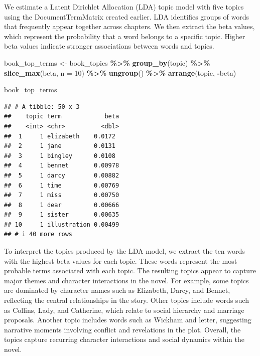 \documentclass[
]{article}
\newenvironment{Shaded}{\begin{snugshade}}{\end{snugshade}}
\newcommand{\AttributeTok}[1]{\textcolor[rgb]{0.13,0.29,0.53}{#1}}
\newcommand{\DecValTok}[1]{\textcolor[rgb]{0.00,0.00,0.81}{#1}}
\newcommand{\FunctionTok}[1]{\textcolor[rgb]{0.13,0.29,0.53}{\textbf{#1}}}
\newcommand{\NormalTok}[1]{#1}
\newcommand{\OtherTok}[1]{\textcolor[rgb]{0.56,0.35,0.01}{#1}}
\newcommand{\SpecialCharTok}[1]{\textcolor[rgb]{0.81,0.36,0.00}{\textbf{#1}}}
\begin{document}
We estimate a Latent Dirichlet Allocation (LDA) topic model with five
topics using the DocumentTermMatrix created earlier. LDA identifies
groups of words that frequently appear together across chapters. We then
extract the beta values, which represent the probability that a word
belongs to a specific topic. Higher beta values indicate stronger
associations between words and topics.

\begin{Shaded}
\begin{Highlighting}[]
\NormalTok{book\_top\_terms }\OtherTok{\textless{}{-}}\NormalTok{ book\_topics }\SpecialCharTok{\%\textgreater{}\%}
  \FunctionTok{group\_by}\NormalTok{(topic) }\SpecialCharTok{\%\textgreater{}\%}
  \FunctionTok{slice\_max}\NormalTok{(beta, }\AttributeTok{n =} \DecValTok{10}\NormalTok{) }\SpecialCharTok{\%\textgreater{}\%}
  \FunctionTok{ungroup}\NormalTok{() }\SpecialCharTok{\%\textgreater{}\%}
  \FunctionTok{arrange}\NormalTok{(topic, }\SpecialCharTok{{-}}\NormalTok{beta)}

\NormalTok{book\_top\_terms}
\end{Highlighting}
\end{Shaded}

\begin{verbatim}
## # A tibble: 50 x 3
##    topic term            beta
##    <int> <chr>          <dbl>
##  1     1 elizabeth    0.0172 
##  2     1 jane         0.0131 
##  3     1 bingley      0.0108 
##  4     1 bennet       0.00978
##  5     1 darcy        0.00882
##  6     1 time         0.00769
##  7     1 miss         0.00750
##  8     1 dear         0.00666
##  9     1 sister       0.00635
## 10     1 illustration 0.00499
## # i 40 more rows
\end{verbatim}

To interpret the topics produced by the LDA model, we extract the ten
words with the highest beta values for each topic. These words represent
the most probable terms associated with each topic. The resulting topics
appear to capture major themes and character interactions in the novel.
For example, some topics are dominated by character names such as
Elizabeth, Darcy, and Bennet, reflecting the central relationships in
the story. Other topics include words such as Collins, Lady, and
Catherine, which relate to social hierarchy and marriage proposals.
Another topic includes words such as Wickham and letter, suggesting
narrative moments involving conflict and revelations in the plot.
Overall, the topics capture recurring character interactions and social
dynamics within the novel.
\end{document}
